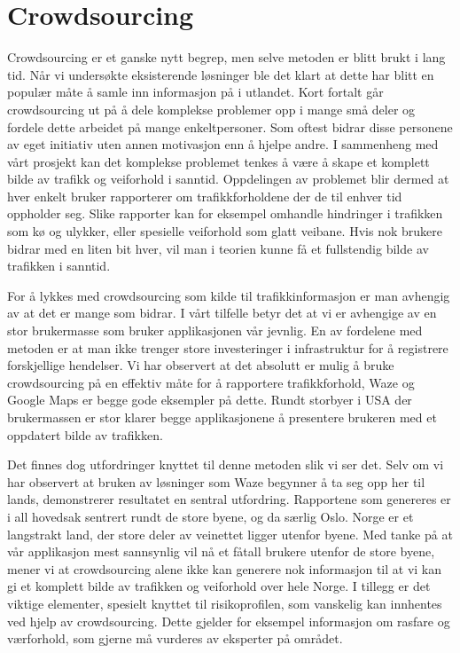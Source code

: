 \documentclass[a4paper,norsk,oneside]{book}
\begin{document}
\section{Crowdsourcing}
\label{sec:crowdsourcing}

Crowdsourcing er et ganske nytt begrep, men selve metoden er blitt brukt i lang tid. Når vi undersøkte eksisterende løsninger ble det klart at dette har blitt en populær måte å samle inn informasjon på i utlandet. Kort fortalt går crowdsourcing ut på å dele komplekse problemer opp i mange små deler og fordele dette arbeidet på mange enkeltpersoner. Som oftest bidrar disse personene av eget initiativ uten annen motivasjon enn å hjelpe andre. I sammenheng med vårt prosjekt kan det komplekse problemet tenkes å være å skape et komplett bilde av trafikk og veiforhold i sanntid. Oppdelingen av problemet blir dermed at hver enkelt bruker rapporterer om trafikkforholdene der de til enhver tid oppholder seg. Slike rapporter kan for eksempel omhandle hindringer i trafikken som kø og ulykker, eller spesielle veiforhold som glatt veibane. Hvis nok brukere bidrar med en liten bit hver, vil man i teorien kunne få et fullstendig bilde av trafikken i sanntid.

For å lykkes med crowdsourcing som kilde til trafikkinformasjon er man avhengig av at det er mange som bidrar. I vårt tilfelle betyr det at vi er avhengige av en stor brukermasse som bruker applikasjonen vår jevnlig. En av fordelene med metoden er at man ikke trenger store investeringer i infrastruktur for å registrere forskjellige hendelser. Vi har observert at det absolutt er mulig å bruke crowdsourcing på en effektiv måte for å rapportere trafikkforhold, Waze og Google Maps er begge gode eksempler på dette. Rundt storbyer i USA der brukermassen er stor klarer begge applikasjonene å presentere brukeren med et oppdatert bilde av trafikken.

Det finnes dog utfordringer knyttet til denne metoden slik vi ser det. Selv om vi har observert at bruken av løsninger som Waze begynner å ta seg opp her til lands, demonstrerer resultatet en sentral utfordring. Rapportene som genereres er i all hovedsak sentrert rundt de store byene, og da særlig Oslo. Norge er et langstrakt land, der store deler av veinettet ligger utenfor byene. Med tanke på at vår applikasjon mest sannsynlig vil nå et fåtall brukere utenfor de store byene, mener vi at crowdsourcing alene ikke kan generere nok informasjon til at vi kan gi et komplett bilde av trafikken og veiforhold over hele Norge. I tillegg er det viktige elementer,  spesielt  knyttet til risikoprofilen, som vanskelig kan innhentes ved hjelp av crowdsourcing. Dette gjelder for eksempel informasjon om rasfare og værforhold, som gjerne må vurderes av eksperter på området.
\end{document}
